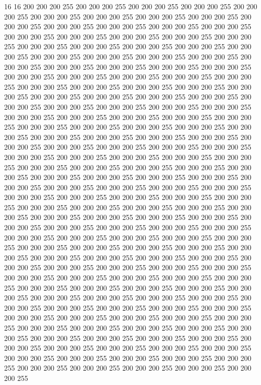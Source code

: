 16 16 200 200 200 255 200 200 200 255 200 200 200 255 200 200 200 255 200 200 200 255 200 200 200 255 200 200 200 255 200 200 200 255 200 200 200 255 200 200 200 255 200 200 200 255 200 200 200 255 200 200 200 255 200 200 200 255 200 200 200 255 200 200 200 255
200 200 200 255 200 200 200 255 200 200 200 255 200 200 200 255 200 200 200 255 200 200 200 255 200 200 200 255 200 200 200 255 200 200 200 255 200 200 200 255 200 200 200 255 200 200 200 255 200 200 200 255 200 200 200 255 200 200 200 255 200 200 200 255
200 200 200 255 200 200 200 255 200 200 200 255 200 200 200 255 200 200 200 255 200 200 200 255 200 200 200 255 200 200 200 255 200 200 200 255 200 200 200 255 200 200 200 255 200 200 200 255 200 200 200 255 200 200 200 255 200 200 200 255 200 200 200 255
200 200 200 255 200 200 200 255 200 200 200 255 200 200 200 255 200 200 200 255 200 200 200 255 200 200 200 255 200 200 200 255 200 200 200 255 200 200 200 255 200 200 200 255 200 200 200 255 200 200 200 255 200 200 200 255 200 200 200 255 200 200 200 255
200 200 200 255 200 200 200 255 200 200 200 255 200 200 200 255 200 200 200 255 200 200 200 255 200 200 200 255 200 200 200 255 200 200 200 255 200 200 200 255 200 200 200 255 200 200 200 255 200 200 200 255 200 200 200 255 200 200 200 255 200 200 200 255
200 200 200 255 200 200 200 255 200 200 200 255 200 200 200 255 200 200 200 255 200 200 200 255 200 200 200 255 200 200 200 255 200 200 200 255 200 200 200 255 200 200 200 255 200 200 200 255 200 200 200 255 200 200 200 255 200 200 200 255 200 200 200 255
200 200 200 255 200 200 200 255 200 200 200 255 200 200 200 255 200 200 200 255 200 200 200 255 200 200 200 255 200 200 200 255 200 200 200 255 200 200 200 255 200 200 200 255 200 200 200 255 200 200 200 255 200 200 200 255 200 200 200 255 200 200 200 255
200 200 200 255 200 200 200 255 200 200 200 255 200 200 200 255 200 200 200 255 200 200 200 255 200 200 200 255 200 200 200 255 200 200 200 255 200 200 200 255 200 200 200 255 200 200 200 255 200 200 200 255 200 200 200 255 200 200 200 255 200 200 200 255
200 200 200 255 200 200 200 255 200 200 200 255 200 200 200 255 200 200 200 255 200 200 200 255 200 200 200 255 200 200 200 255 200 200 200 255 200 200 200 255 200 200 200 255 200 200 200 255 200 200 200 255 200 200 200 255 200 200 200 255 200 200 200 255
200 200 200 255 200 200 200 255 200 200 200 255 200 200 200 255 200 200 200 255 200 200 200 255 200 200 200 255 200 200 200 255 200 200 200 255 200 200 200 255 200 200 200 255 200 200 200 255 200 200 200 255 200 200 200 255 200 200 200 255 200 200 200 255
200 200 200 255 200 200 200 255 200 200 200 255 200 200 200 255 200 200 200 255 200 200 200 255 200 200 200 255 200 200 200 255 200 200 200 255 200 200 200 255 200 200 200 255 200 200 200 255 200 200 200 255 200 200 200 255 200 200 200 255 200 200 200 255
